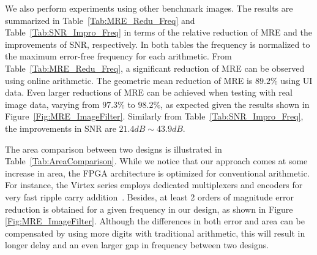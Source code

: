 \documentclass{acm_proc_article-sp}
\begin{document}
We also perform experiments using other benchmark images. The results are summarized in Table~\ref{Tab:MRE_Redu_Freq} and Table~\ref{Tab:SNR_Impro_Freq} in terms of the relative reduction of MRE and the improvements of SNR, respectively. In both tables the frequency is normalized to the maximum error-free frequency for each arithmetic. From Table~\ref{Tab:MRE_Redu_Freq}, a significant reduction of MRE can be observed using online arithmetic. The geometric mean reduction of MRE is $89.2\%$ using UI data. Even larger reductions of MRE can be achieved when testing with real image data, varying from $97.3\%$ to $98.2\%$, as expected given the results shown in Figure~\ref{Fig:MRE_ImageFilter}. Similarly from Table~\ref{Tab:SNR_Impro_Freq}, the improvements in SNR are $21.4dB\sim43.9dB$.\vspace{-1ex}
%

%
The area comparison between two designs is illustrated in Table~\ref{Tab:AreaComparison}. While we notice that our approach comes at some increase in area, the FPGA architecture is optimized for conventional arithmetic. For instance, the Virtex series employs dedicated multiplexers and encoders for very fast ripple carry addition~\cite{Virtex6}. Besides, at least 2 orders of magnitude error reduction is obtained for a given frequency in our design, as shown in Figure \ref{Fig:MRE_ImageFilter}. Although the differences in both error and area can be compensated by using more digits with traditional arithmetic, this will result in longer delay and an even larger gap in frequency between two designs.
\end{document}
